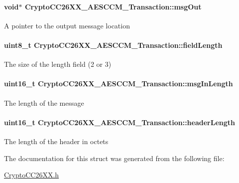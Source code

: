 \paragraph[{msg\-Out}]{\setlength{\rightskip}{0pt plus 5cm}void$\ast$ Crypto\-C\-C26\-X\-X\-\_\-\-A\-E\-S\-C\-C\-M\-\_\-\-Transaction\-::msg\-Out}\label{struct_crypto_c_c26_x_x___a_e_s_c_c_m___transaction_a75508e70a56c297c0bc4351cd586bfdc}
A pointer to the output message location 
\paragraph[{field\-Length}]{\setlength{\rightskip}{0pt plus 5cm}uint8\-\_\-t Crypto\-C\-C26\-X\-X\-\_\-\-A\-E\-S\-C\-C\-M\-\_\-\-Transaction\-::field\-Length}\label{struct_crypto_c_c26_x_x___a_e_s_c_c_m___transaction_a8d848bfae83f3b16e8d3a7e83a1c5694}
The size of the length field (2 or 3) 
\paragraph[{msg\-In\-Length}]{\setlength{\rightskip}{0pt plus 5cm}uint16\-\_\-t Crypto\-C\-C26\-X\-X\-\_\-\-A\-E\-S\-C\-C\-M\-\_\-\-Transaction\-::msg\-In\-Length}\label{struct_crypto_c_c26_x_x___a_e_s_c_c_m___transaction_aa29e2771fcf7967303c7a761e23630fc}
The length of the message 
\paragraph[{header\-Length}]{\setlength{\rightskip}{0pt plus 5cm}uint16\-\_\-t Crypto\-C\-C26\-X\-X\-\_\-\-A\-E\-S\-C\-C\-M\-\_\-\-Transaction\-::header\-Length}\label{struct_crypto_c_c26_x_x___a_e_s_c_c_m___transaction_a28e4d04c356e342908588e19011a0e5d}
The length of the header in octets 

The documentation for this struct was generated from the following file\-:\begin{DoxyCompactItemize}
\item 
\hyperlink{_crypto_c_c26_x_x_8h}{Crypto\-C\-C26\-X\-X.\-h}\end{DoxyCompactItemize}

